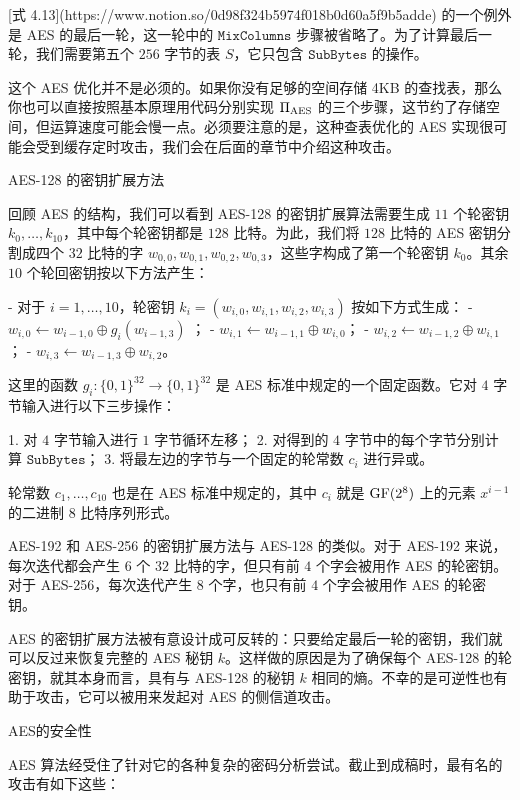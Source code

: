 [式 4.13](https://www.notion.so/0d98f324b5974f018b0d60a5f9b5adde) 的一个例外是 AES 的最后一轮，这一轮中的 $\mathtt{MixColumns}$ 步骤被省略了。为了计算最后一轮，我们需要第五个 $256$ 字节的表 $S$，它只包含 $\mathtt{SubBytes}$ 的操作。

这个 AES 优化并不是必须的。如果你没有足够的空间存储 4KB 的查找表，那么你也可以直接按照基本原理用代码分别实现 $\Pi_{\rm AES}$ 的三个步骤，这节约了存储空间，但运算速度可能会慢一点。必须要注意的是，这种查表优化的 AES 实现很可能会受到缓存定时攻击，我们会在后面的章节中介绍这种攻击。

AES-128 的密钥扩展方法

回顾 AES 的结构，我们可以看到 AES-128 的密钥扩展算法需要生成 $11$ 个轮密钥 $k_0,\dots,k_{10}$，其中每个轮密钥都是 $128$ 比特。为此，我们将 $128$ 比特的 AES 密钥分割成四个 $32$ 比特的字 $w_{0,0},w_{0,1},w_{0,2},w_{0,3}$，这些字构成了第一个轮密钥 $k_0$。其余 $10$ 个轮回密钥按以下方法产生：

- 对于 $i=1,\dots,10$，轮密钥 $k_i=(w_{i,0},w_{i,1},w_{i,2},w_{i,3})$ 按如下方式生成：
    - $w_{i,0}\leftarrow w_{i-1,0}\oplus g_i(w_{i-1,3})$ ；
    - $w_{i,1}\leftarrow w_{i-1,1}\oplus w_{i,0}$；
    - $w_{i,2}\leftarrow w_{i-1,2}\oplus w_{i,1}$；
    - $w_{i,3}\leftarrow w_{i-1,3}\oplus w_{i,2}$。

这里的函数 $g_i:\{0,1\}^{32}\to\{0,1\}^{32}$ 是 AES 标准中规定的一个固定函数。它对 $4$ 字节输入进行以下三步操作：

1. 对 $4$ 字节输入进行 $1$ 字节循环左移；
2. 对得到的 $4$ 字节中的每个字节分别计算 $\mathtt{SubBytes}$；
3. 将最左边的字节与一个固定的轮常数 $c_i$ 进行异或。

轮常数 $c_1,\dots,c_{10}$ 也是在 AES 标准中规定的，其中 $c_i$ 就是 ${\rm GF}(2^8)$ 上的元素 $x^{i-1}$ 的二进制 $8$ 比特序列形式。

AES-192 和 AES-256 的密钥扩展方法与 AES-128 的类似。对于 AES-192 来说，每次迭代都会产生 $6$ 个 $32$ 比特的字，但只有前 $4$ 个字会被用作 AES 的轮密钥。对于 AES-256，每次迭代产生 $8$ 个字，也只有前 $4$ 个字会被用作 AES 的轮密钥。

AES 的密钥扩展方法被有意设计成可反转的：只要给定最后一轮的密钥，我们就可以反过来恢复完整的 AES 秘钥 $k$。这样做的原因是为了确保每个 AES-128 的轮密钥，就其本身而言，具有与 AES-128 的秘钥 $k$ 相同的熵。不幸的是可逆性也有助于攻击，它可以被用来发起对 AES 的侧信道攻击。

AES的安全性

AES 算法经受住了针对它的各种复杂的密码分析尝试。截止到成稿时，最有名的攻击有如下这些：

